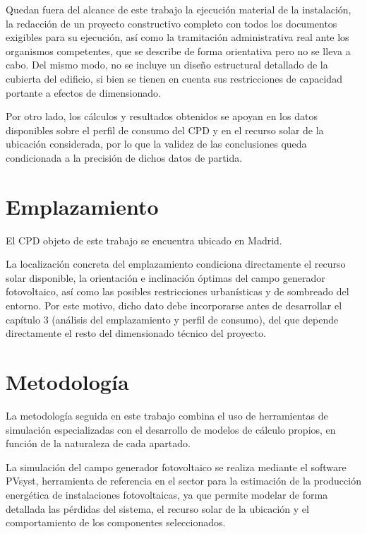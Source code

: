 Quedan fuera del alcance de este trabajo la ejecución material de la instalación, la redacción de un proyecto constructivo completo con todos los documentos exigibles para su ejecución, así como la tramitación administrativa real ante los organismos competentes, que se describe de forma orientativa pero no se lleva a cabo. Del mismo modo, no se incluye un diseño estructural detallado de la cubierta del edificio, si bien se tienen en cuenta sus restricciones de capacidad portante a efectos de dimensionado.

Por otro lado, los cálculos y resultados obtenidos se apoyan en los datos disponibles sobre el perfil de consumo del \ac{CPD} y en el recurso solar de la ubicación considerada, por lo que la validez de las conclusiones queda condicionada a la precisión de dichos datos de partida.

\section{Emplazamiento}
\label{sec:intro-emplazamiento}

El \ac{CPD} objeto de este trabajo se encuentra ubicado en Madrid.

La localización concreta del emplazamiento condiciona directamente el recurso solar disponible, la orientación e inclinación óptimas del campo generador fotovoltaico, así como las posibles restricciones urbanísticas y de sombreado del entorno. Por este motivo, dicho dato debe incorporarse antes de desarrollar el capítulo 3 (análisis del emplazamiento y perfil de consumo), del que depende directamente el resto del dimensionado técnico del proyecto.

\section{Metodología}
\label{sec:intro-metodologia}

La metodología seguida en este trabajo combina el uso de herramientas de simulación especializadas con el desarrollo de modelos de cálculo propios, en función de la naturaleza de cada apartado.

La simulación del campo generador fotovoltaico se realiza mediante el software PVsyst, herramienta de referencia en el sector para la estimación de la producción energética de instalaciones fotovoltaicas, ya que permite modelar de forma detallada las pérdidas del sistema, el recurso solar de la ubicación y el comportamiento de los componentes seleccionados.


